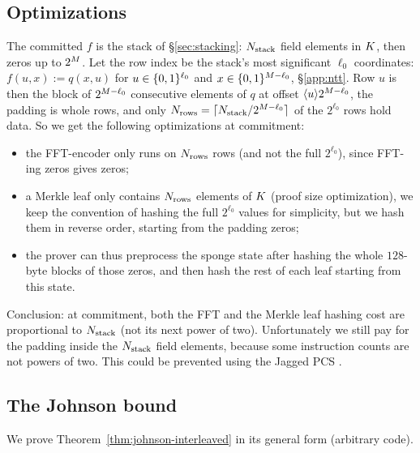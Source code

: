 \subsection{Optimizations}\label{sec:pcs-opt}

The committed $f$ is the stack of \S\ref{sec:stacking}: $N_{\mathrm{stack}}$ field elements in $K$, then zeros up to $2^{M}$. Let the row index be the stack's most significant $\ell_0$ coordinates: $f(u, x) := q(x, u)$ for $u \in \{0,1\}^{\ell_0}$ and $x \in \{0,1\}^{M - \ell_0}$, \S\ref{app:ntt}. Row $u$ is then the block of $2^{M - \ell_0}$ consecutive elements of $q$ at offset $\langle u \rangle 2^{M - \ell_0}$, the padding is whole rows, and only $N_{\mathrm{rows}}=\lceil N_{\mathrm{stack}}/2^{M-\ell_0}\rceil$ of the $2^{\ell_0}$ rows hold data. So we get the following optimizations at commitment:
\begin{itemize}[itemsep=1pt,topsep=2pt]
\item the FFT-encoder only runs on $N_{\mathrm{rows}}$ rows (and not the full $2^{\ell_0}$), since FFT-ing zeros gives zeros;
\item a Merkle leaf only contains $N_{\mathrm{rows}}$ elements of $K$ (proof size optimization), we keep the convention of hashing the full $2^{\ell_0}$ values for simplicity, but we hash them in reverse order, starting from the padding zeros;
\item the prover can thus preprocess the sponge state after hashing the whole $128$-byte blocks of those zeros, and then hash the rest of each leaf starting from this state.
\end{itemize}

Conclusion: at commitment, both the FFT and the Merkle leaf hashing cost are proportional to $N_{\mathrm{stack}}$ (not its next power of two). Unfortunately we still pay for the padding inside the $N_{\mathrm{stack}}$ field elements, because some instruction counts are not powers of two. This could be prevented using the Jagged PCS \cite{jagged_pcs}.


\subsection{The Johnson bound}\label{app:johnson}

We prove Theorem~\ref{thm:johnson-interleaved} in its general form (arbitrary code).

